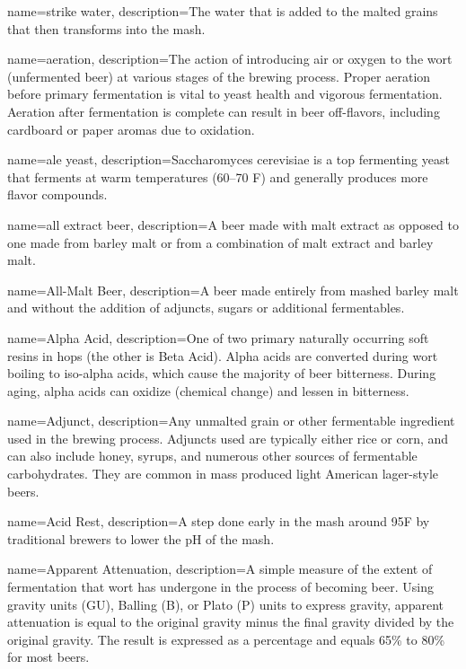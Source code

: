 \usepackage[toc,nopostdot]{glossaries}


{
  name={strike water},
  description={The water that is added to the malted grains that then transforms into the mash.}
}

{
  name={aeration},
  description={The action of introducing air or oxygen to the wort (unfermented beer) at various stages of the brewing process. Proper aeration before primary fermentation is vital to yeast health and vigorous fermentation. Aeration after fermentation is complete can result in beer off-flavors, including cardboard or paper aromas due to oxidation.}
}

{
  name={ale yeast},
  description={Saccharomyces cerevisiae is a top fermenting yeast that ferments at warm temperatures (60--70 F) and generally produces more flavor compounds.}
}

{
  name={all extract beer},
  description={A beer made with malt extract as opposed to one made from barley malt or from a combination of malt extract and barley malt.}
}
 
{
  name={All-Malt Beer},
  description={A beer made entirely from mashed barley malt and without the addition of adjuncts, sugars or additional fermentables.}
}

{
  name={Alpha Acid},
  description={One of two primary naturally occurring soft resins in hops (the other is Beta Acid). Alpha acids are converted during wort boiling to iso-alpha acids, which cause the majority of beer bitterness. During aging, alpha acids can oxidize (chemical change) and lessen in bitterness.}
}

{
  name=Adjunct,
  description={Any unmalted grain or other fermentable ingredient used in the brewing process. Adjuncts used are typically either rice or corn, and can also include honey, syrups, and numerous other sources of fermentable carbohydrates. They are common in mass produced light American lager-style beers.}
  }

{
  name={Acid Rest},
  description={A step done early in the mash around 95F by traditional brewers to lower the pH of the mash.}
  }

{
  name={Apparent Attenuation},
  description={A simple measure of the extent of fermentation that wort has undergone in the process of becoming beer. Using gravity units (GU), Balling (B), or Plato (P) units to express gravity, apparent attenuation is equal to the original gravity minus the final gravity divided by the original gravity. The result is expressed as a percentage and equals 65\% to 80\% for most beers.}
  }

